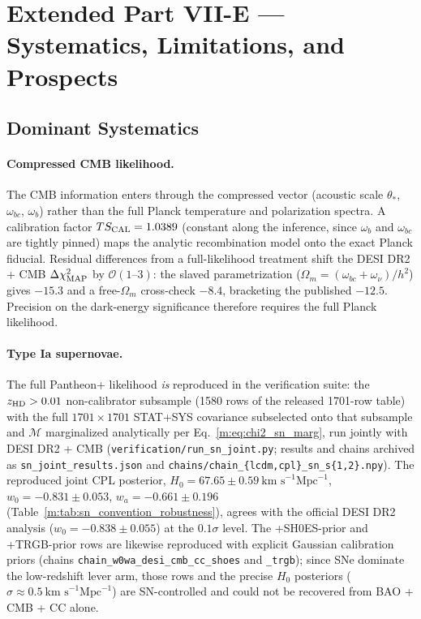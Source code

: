 \documentclass[aps,prd,preprint,superscriptaddress,nofootinbib]{revtex4-2}
\begin{document}
\section{Extended Part VII-E --- Systematics, Limitations, and Prospects}
\label{m:sec:systematics}

\subsection{Dominant Systematics}

\paragraph{Compressed CMB likelihood.} The CMB information enters through the compressed vector (acoustic scale $\theta_*$, $\omega_{bc}$, $\omega_b$) rather than the full Planck temperature and polarization spectra. A calibration factor $TS_{\rm CAL} = 1.0389$ (constant along the inference, since $\omega_b$ and $\omega_{bc}$ are tightly pinned) maps the analytic recombination model onto the exact Planck fiducial. Residual differences from a full-likelihood treatment shift the DESI DR2 + CMB $\Delta\chi^2_{\rm MAP}$ by $\mathcal{O}(1\text{--}3)$: the slaved parametrization ($\Omega_m = (\omega_{bc} + \omega_\nu)/h^2$) gives $-15.3$ and a free-$\Omega_m$ cross-check $-8.4$, bracketing the published $-12.5$. Precision on the dark-energy significance therefore requires the full Planck likelihood.

\paragraph{Type Ia supernovae.} The full Pantheon+ likelihood \emph{is} reproduced in the verification suite: the $z_{\rm HD} > 0.01$ non-calibrator subsample (1580 rows of the released 1701-row table) with the full $1701 \times 1701$ STAT+SYS covariance subselected onto that subsample and $\mathcal{M}$ marginalized analytically per Eq.~\ref{m:eq:chi2_sn_marg}, run jointly with DESI DR2 + CMB (\texttt{verification/run\_sn\_joint.py}; results and chains archived as \texttt{sn\_joint\_results.json} and \texttt{chains/chain\_\{lcdm,cpl\}\_sn\_s\{1,2\}.npy}). The reproduced joint CPL posterior, $H_0 = 67.65 \pm 0.59~\text{km~s}^{-1}\text{Mpc}^{-1}$, $w_0 = -0.831 \pm 0.053$, $w_a = -0.661 \pm 0.196$ (Table~\ref{m:tab:sn_convention_robustness}), agrees with the official DESI DR2 analysis ($w_0 = -0.838 \pm 0.055$) at the $0.1\sigma$ level. The +SH0ES-prior and +TRGB-prior rows are likewise reproduced with explicit Gaussian calibration priors (chains \texttt{chain\_w0wa\_desi\_cmb\_cc\_shoes} and \texttt{\_trgb}); since SNe dominate the low-redshift lever arm, those rows and the precise $H_0$ posteriors ($\sigma \approx 0.5~\text{km~s}^{-1}\text{Mpc}^{-1}$) are SN-controlled and could not be recovered from BAO + CMB + CC alone.
\end{document}
